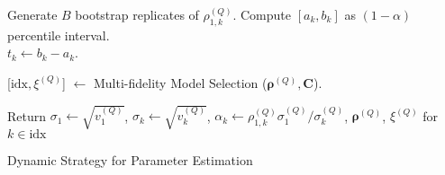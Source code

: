 \begin{algorithm}[!ht]
{{{    }{
        
            Generate $B$ bootstrap replicates of $\rho_{1,k}^{(Q)}$. Compute $[a_k, b_k]$ as $(1-\alpha)$ percentile interval. \\
            $t_k \gets b_k - a_k$.
        
    }

    
    }
    
    
    [$\text{idx},\xi^{(Q)}$] $\gets$ Multi-fidelity Model Selection ($\boldsymbol{\rho}^{(Q)},\boldsymbol{C}$).\\
    
    
    
    }


    

    
    
    
    
    
    
Return $\sigma_1 \gets \sqrt{v_1^{(Q)}}$, $\sigma_k \gets \sqrt{v_k^{(Q)}}$, $\alpha_k \gets \rho_{1,k}^{(Q)} \sigma_1^{(Q)} / \sigma_k^{(Q)}$, $\boldsymbol{\rho}^{(Q)}$, $\xi^{(Q)}$ for $k \in \text{idx}$
\caption{Dynamic Strategy for Parameter Estimation}
\end{algorithm}
\ULforem
%


